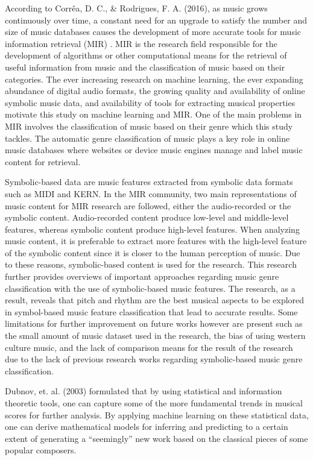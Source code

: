 According to Corrêa, D. C., \& Rodrigues, F. A. (2016), as music grows continuously over time, a constant need for an upgrade to satisfy the number and size of music databases causes the development of more accurate tools for music information retrieval (MIR) . MIR is the research field responsible for the development of algorithms or other computational means for the retrieval of useful information from music and the classification of music based on their categories. The ever increasing research on machine learning, the ever expanding abundance of digital audio formats, the growing quality and availability of online symbolic music data, and availability of tools for extracting musical properties motivate this study on machine learning and MIR. One of the main problems in MIR involves the classification of music based on their genre which this study tackles. The automatic genre classification of music plays a key role in online music databases where websites or device music engines manage and label music content for retrieval.

Symbolic-based data are music features extracted from symbolic data formats such as MIDI and KERN. In the MIR community, two main representations of music content for MIR research are followed, either the audio-recorded or the symbolic content. Audio-recorded content produce low-level and middle-level features, whereas symbolic content produce high-level features. When analyzing music content, it is preferable to extract more features with the high-level feature of the symbolic content since it is closer to the human perception of music. Due to these reasons, symbolic-based content is used for the research. This research further provides overviews of important approaches regarding music genre classification with the use of symbolic-based music features. The research, as a result, reveals that pitch and rhythm are the best musical aspects to be explored in symbol-based music feature classification that lead to accurate results.  Some limitations for further improvement on future works however are present such as the small amount of music dataset used in the research, the bias of using western culture music, and the lack of comparison means for the result of the research due to the lack of previous research works regarding symbolic-based music genre classification.

Dubnov, et. al. (2003) formulated that by using statistical and information theoretic tools, one can capture some of the more fundamental trends in musical scores for further analysis. By applying machine learning on these statistical data, one can derive mathematical models for inferring and predicting to a certain extent of generating a “seemingly” new work based on the classical pieces of some popular composers.

